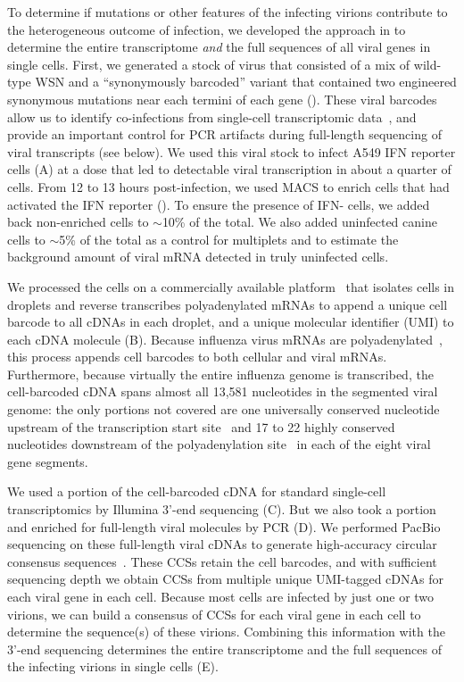 \documentclass[9pt,lineno]{template}
\begin{document}
To determine if mutations or other features of the infecting virions contribute to the heterogeneous outcome of infection, we developed the approach in  to determine the entire transcriptome \emph{and} the full sequences of all viral genes in single cells.
First, we generated a stock of virus that consisted of a mix of wild-type WSN and a ``synonymously barcoded'' variant that contained two engineered synonymous mutations near each termini of each gene ().
These viral barcodes allow us to identify co-infections from single-cell transcriptomic data~\citep{russell2018extreme}, and provide an important control for PCR artifacts during full-length sequencing of viral transcripts (see below).
We used this viral stock to infect A549 IFN reporter cells (A) at a dose that led to detectable viral transcription in about a quarter of cells.
From 12 to 13 hours post-infection, we used MACS to enrich cells that had activated the IFN reporter ().
To ensure the presence of IFN- cells, we added back non-enriched cells to $\sim$10\% of the total.
We also added uninfected canine cells to $\sim$5\% of the total as a control for multiplets and to estimate the background amount of viral mRNA detected in truly uninfected cells.

We processed the cells on a commercially available platform~\citep{zheng2017massively} that isolates cells in droplets and reverse transcribes polyadenylated mRNAs to append a unique cell barcode to all cDNAs in each droplet, and a unique molecular identifier (UMI) to each cDNA molecule (B).
Because influenza virus mRNAs are polyadenylated~\citep{robertson1981polyadenylation}, this process appends cell barcodes to both cellular and viral mRNAs.
Furthermore, because virtually the entire influenza genome is transcribed, the cell-barcoded cDNA spans almost all 13,581 nucleotides in the segmented viral genome: the only portions not covered are one universally conserved nucleotide upstream of the transcription start site~\citep{koppstein2015sequencing} and 17 to 22 highly conserved nucleotides downstream of the polyadenylation site~\citep{robertson1981polyadenylation} in each of the eight viral gene segments.

We used a portion of the cell-barcoded cDNA for standard single-cell transcriptomics by Illumina 3'-end sequencing (C).
But we also took a portion and enriched for full-length viral molecules by PCR (D).
We performed PacBio sequencing on these full-length viral cDNAs to generate high-accuracy circular consensus sequences~\citep[CCSs;][]{travers2010flexible}.
These CCSs retain the cell barcodes, and with sufficient sequencing depth we obtain CCSs from multiple unique UMI-tagged cDNAs for each viral gene in each cell.
Because most cells are infected by just one or two virions, we can build a consensus of CCSs for each viral gene in each cell to determine the sequence(s) of these virions.
Combining this information with the 3'-end sequencing determines the entire transcriptome and the full sequences of the infecting virions in single cells (E).
\end{document}

